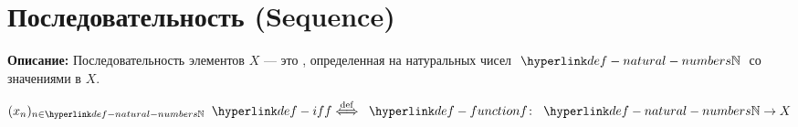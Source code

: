 
\section{Последовательность (Sequence)}
\label{entity:obj-sequence}

\textbf{Описание:}
Последовательность элементов  $X$ — это , определенная на  натуральных чисел $\NaturalNumbers$ со значениями в $X$.

\hypertarget{def-sequence}{}
\begin{definition}
 

\[
(x_n)_{n \in \NaturalNumbers} \TermDefIff \Function{f} \colon \NaturalNumbers \to X
\]
\end{definition}